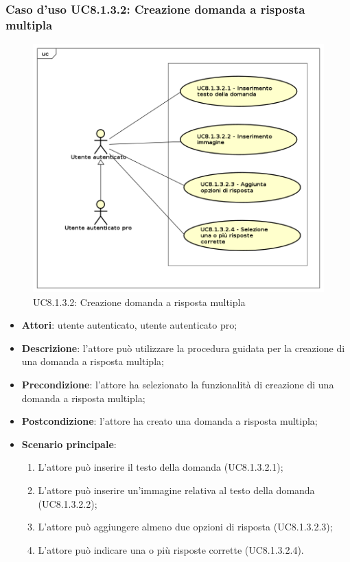 \subsubsection{Caso d'uso UC8.1.3.2: Creazione domanda a risposta multipla}
	\label{UC8.1.3.2}
	\begin{figure}[h]
		\centering
			\includegraphics[scale=0.45,keepaspectratio]{UML/UC8_1_3_2.png}
		\caption{UC8.1.3.2: Creazione domanda a risposta multipla}
	\end{figure}
	\FloatBarrier
	\begin{itemize}
		\item
			\textbf{Attori}: utente autenticato, utente autenticato pro;
		\item		
			\textbf{Descrizione}: l'attore può utilizzare la procedura guidata per la creazione di una domanda a risposta multipla;
		\item
			\textbf{Precondizione}: l'attore ha selezionato la funzionalità di creazione di una domanda a risposta multipla;
		\item
			\textbf{Postcondizione}: l'attore ha creato una domanda a risposta multipla;
		\item
			\textbf{Scenario principale}:
	       		\begin{enumerate}
	       			\item
	       			L'attore può inserire il testo della domanda (UC8.1.3.2.1);
	       			\item
	       			L'attore può inserire un'immagine relativa al testo della domanda (UC8.1.3.2.2);
	       			\item
	       			L'attore può aggiungere almeno due opzioni di risposta (UC8.1.3.2.3);
					\item
					L'attore può indicare una o più risposte corrette (UC8.1.3.2.4).
	 			\end{enumerate}
	\end{itemize}

